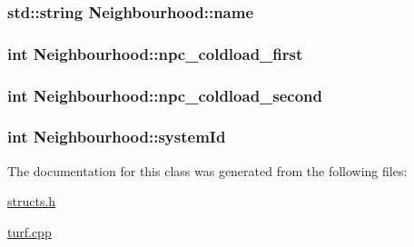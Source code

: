 \hypertarget{classNeighbourhood_a82bbd15ea0bdccee88d398070b707a04}{
\subsubsection[{name}]{\setlength{\rightskip}{0pt plus 5cm}std\-::string Neighbourhood\-::name}}\label{classNeighbourhood_a82bbd15ea0bdccee88d398070b707a04}
\hypertarget{classNeighbourhood_a7babc46bba2f997a9fd577d273bbd94f}{
\subsubsection[{npc\-\_\-coldload\-\_\-first}]{\setlength{\rightskip}{0pt plus 5cm}int Neighbourhood\-::npc\-\_\-coldload\-\_\-first}}\label{classNeighbourhood_a7babc46bba2f997a9fd577d273bbd94f}
\hypertarget{classNeighbourhood_a555736237cc2685a9aa2c16c707b8816}{
\subsubsection[{npc\-\_\-coldload\-\_\-second}]{\setlength{\rightskip}{0pt plus 5cm}int Neighbourhood\-::npc\-\_\-coldload\-\_\-second}}\label{classNeighbourhood_a555736237cc2685a9aa2c16c707b8816}
\hypertarget{classNeighbourhood_aace0c7358a67b0ba20a34cdfdc82571b}{
\subsubsection[{system\-Id}]{\setlength{\rightskip}{0pt plus 5cm}int Neighbourhood\-::system\-Id}}\label{classNeighbourhood_aace0c7358a67b0ba20a34cdfdc82571b}


The documentation for this class was generated from the following files\-:\begin{DoxyCompactItemize}
\item 
\hyperlink{structs_8h}{structs.\-h}\item 
\hyperlink{turf_8cpp}{turf.\-cpp}\end{DoxyCompactItemize}
